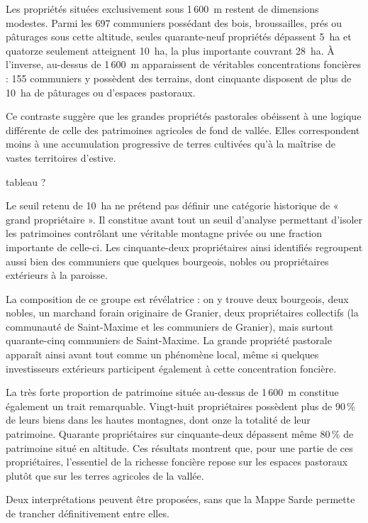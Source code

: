 \documentclass[12pt,a4paper]{report}
\begin{document}
	Les propriétés situées exclusivement sous 1\,600~m restent de dimensions modestes. Parmi les 697 communiers possédant des bois, broussailles, prés ou pâturages sous cette altitude, seules quarante-neuf propriétés dépassent 5~ha et quatorze seulement atteignent 10~ha, la plus importante couvrant 28~ha. À l'inverse, au-dessus de 1\,600~m apparaissent de véritables concentrations foncières : 155 communiers y possèdent des terrains, dont cinquante disposent de plus de 10~ha de pâturages ou d'espaces pastoraux.
	
	Ce contraste suggère que les grandes propriétés pastorales obéissent à une logique différente de celle des patrimoines agricoles de fond de vallée. Elles correspondent moins à une accumulation progressive de terres cultivées qu'à la maîtrise de vastes territoires d'estive.
	
	tableau ?
	
	Le seuil retenu de 10~ha ne prétend pas définir une catégorie historique de « grand propriétaire ». Il constitue avant tout un seuil d'analyse permettant d'isoler les patrimoines contrôlant une véritable montagne privée ou une fraction importante de celle-ci. Les cinquante-deux propriétaires ainsi identifiés regroupent aussi bien des communiers que quelques bourgeois, nobles ou propriétaires extérieurs à la paroisse.
	
	La composition de ce groupe est révélatrice : on y trouve deux bourgeois, deux nobles, un marchand forain originaire de Granier, deux propriétaires collectifs (la communauté de Saint-Maxime et les communiers de Granier), mais surtout quarante-cinq communiers de Saint-Maxime. La grande propriété pastorale apparaît ainsi avant tout comme un phénomène local, même si quelques investisseurs extérieurs participent également à cette concentration foncière.
	
	La très forte proportion de patrimoine située au-dessus de 1\,600~m constitue également un trait remarquable. Vingt-huit propriétaires possèdent plus de 90\,\% de leurs biens dans les hautes montagnes, dont onze la totalité de leur patrimoine. Quarante propriétaires sur cinquante-deux dépassent même 80\,\% de patrimoine situé en altitude. Ces résultats montrent que, pour une partie de ces propriétaires, l'essentiel de la richesse foncière repose sur les espaces pastoraux plutôt que sur les terres agricoles de la vallée.
	
	Deux interprétations peuvent être proposées, sans que la Mappe Sarde permette de trancher définitivement entre elles.
	
\end{document}
